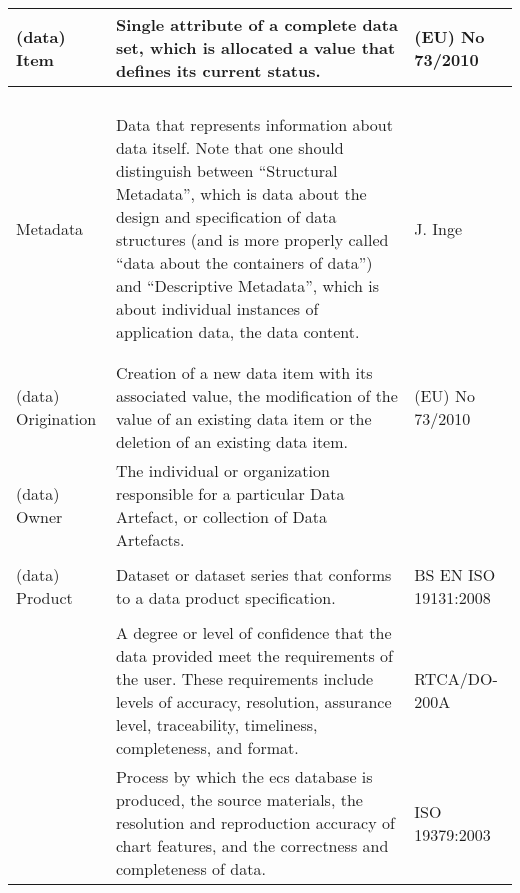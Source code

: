 \begin{longtable}{|p{}|L{}|L{}|}
  \hline
  (data) Item & Single attribute of a complete data set, which is allocated a value that defines its current status. & (EU) No 73/2010 \cite{citation:EU732010}\\
  \hline
  \\
  \hline
  \\
  \hline
  \\
  \hline
  \\
  \hline
  Metadata & Data that represents information about data itself. Note that one should distinguish between ``Structural Metadata'', which is data about the design and specification of data structures (and is more properly called ``data about the containers of data'') and ``Descriptive Metadata'', which is about individual instances of application data, the data content. & J. Inge \cite{citation:inge2008improving}\\
  \hline
  \\
  \hline
  \\
  \hline
  (data) Origination & Creation of a new data item with its associated value, the modification of the value of an existing data item or the deletion of an existing data item. & (EU) No 73/2010 \cite{citation:EU732010}\\
  \hline
  (data) Owner & The individual or organization responsible for a particular Data Artefact, or collection of Data Artefacts. & \\
  \hline
  \\
  \hline
  (data) Product & Dataset or dataset series that conforms to a data product specification. & BS EN ISO 19131:2008 \cite{citation:ISO19131}\\
  \hline
  \\
  \hline
  & A degree or level of confidence that the data provided meet the requirements of the user. These requirements include levels of accuracy, resolution, assurance level, traceability, timeliness, completeness, and format. & RTCA/DO-200A \cite{citation:ED76}\\
  & Process by which the \gls{ecs} database is produced, the source materials, the resolution and reproduction accuracy of chart features, and the correctness and completeness of data. & ISO 19379:2003 \cite{citation:ISO19379}\\

\end{longtable}
